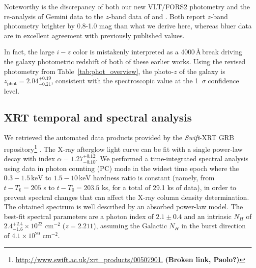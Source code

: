 \documentclass{aa}    %
\newcommand\todo[1]{\textbf{(#1)}}
\begin{document}
Noteworthy is the discrepancy of both our new VLT/FORS2 photometry and the re-analysis of Gemini data to the $z$-band data of \citet{Margutti2012} and \citet{Sakamoto2013}. Both report $z$-band photometry brighter by 0.8-1.0 mag than what we derive here, whereas bluer data are in excellent agreement with previously published values.

In fact, the large $i-z$ color is mistakenly interpreted as a 4000\,\AA\,break driving the galaxy photometric redshift of both of these earlier works. Using the revised photometry from Table~\ref{tab:phot_overview}, the photo-$z$ of the galaxy is $z_{\mathrm{phot}}=2.04_{-0.21}^{+0.19}$, consistent with the spectroscopic value at the 1~$\sigma$ confidence level.






\subsection{XRT temporal and spectral analysis}

We retrieved the automated data products provided by the \textit{Swift}-XRT GRB repository\footnote{\url{http://www.swift.ac.uk/xrt\_products/00507901.} \todo{Broken link, Paolo?}} \citep{Evans2009}. The X-ray afterglow light curve can be fit with a single power-law decay with index $\alpha=1.27_{-0.10}^{+0.12}$. We performed a time-integrated spectral analysis using data in photon counting (PC) mode in the widest time epoch where the $0.3-1.5\,\mathrm{keV}$ to $1.5-10\,\mathrm{keV}$ hardness ratio is constant (namely, from $t-T_0 = 205$ s to $t-T_0 = 203.5$ ks, for a total of 29.1 ks of data), in order to prevent spectral changes that can affect the X-ray column density determination. The obtained spectrum is well described by an absorbed power-law model. The best-fit spectral parameters are a photon index of $2.1 \pm 0.4$ and an intrinsic $N_{H}$ of $2.4_{-1.6}^{+2.4} \times 10^{22}$ cm$^{-2}$ ($z=2.211$), assuming the Galactic $N_{H}$ in the burst direction of $4.1 \times 10^{20}$ cm$^{-2}$.
\end{document}
